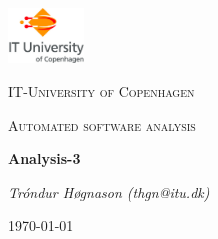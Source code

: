 
\begin{titlepage}
	\centering
	\includegraphics[width=0.15\textwidth]{logo}\par\vspace{1cm}
	{\scshape\LARGE IT-University of Copenhagen \par}
	\vspace{1cm}
	{\scshape\Large Automated software analysis\par}
	\vspace{1.5cm}
	{\huge\bfseries Analysis-3\par}
	\vspace{2cm}
	{\Large\itshape Tróndur Høgnason (thgn@itu.dk)\par}
\vspace{\fill}
	{\large \today\par}
\end{titlepage}